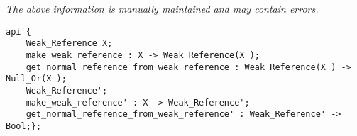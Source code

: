 \label{api:Weak\_Reference}

{\tiny \it The above information is manually maintained and may contain errors.}
\begin{verbatim}
api {
    Weak_Reference X;
    make_weak_reference : X -> Weak_Reference(X );
    get_normal_reference_from_weak_reference : Weak_Reference(X ) -> Null_Or(X );
    Weak_Reference';
    make_weak_reference' : X -> Weak_Reference';
    get_normal_reference_from_weak_reference' : Weak_Reference' -> Bool;};
\end{verbatim}
